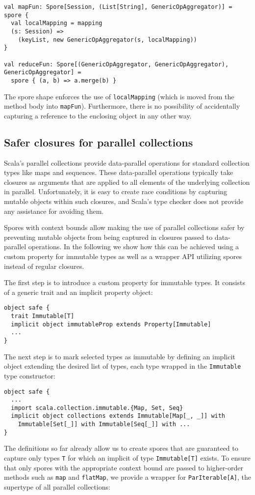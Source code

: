 \documentclass{llncs}
\begin{document}
\begin{lstlisting}
val mapFun: Spore[Session, (List[String], GenericOpAggregator)] = spore {
  val localMapping = mapping
  (s: Session) =>
    (keyList, new GenericOpAggregator(s, localMapping))
}

val reduceFun: Spore[(GenericOpAggregator, GenericOpAggregator), GenericOpAggregator] =
  spore { (a, b) => a.merge(b) }
\end{lstlisting}
\noindent
The spore shape enforces the use of \verb|localMapping| (which is moved from the method body into \verb|mapFun|). Furthermore, there is no possibility of accidentally capturing a reference to the enclosing object in any other way.


\subsection{Safer closures for parallel collections}

Scala's parallel collections provide data-parallel operations for standard collection types like maps and sequences. These data-parallel operations typically take closures as arguments that are applied to all elements of the underlying collection in parallel. Unfortunately, it is easy to create race conditions by capturing mutable objects within such closures, and Scala's type checker does not provide any assistance for avoiding them.

Spores with context bounds allow making the use of parallel collections safer by preventing mutable objects from being captured in closures passed to data-parallel operations. In the following we show how this can be achieved using a custom property for immutable types as well as a wrapper API utilizing spores instead of regular closures.

The first step is to introduce a custom property for immutable types. It consists of a generic trait and an implicit property object:

\begin{verbatim}
object safe {
  trait Immutable[T]
  implicit object immutableProp extends Property[Immutable]
  ...
}
\end{verbatim}
\noindent
The next step is to mark selected types as immutable by defining an implicit object extending the desired list of types, each type wrapped in the \verb|Immutable| type constructor:

\begin{verbatim}
object safe {
  ...
  import scala.collection.immutable.{Map, Set, Seq}
  implicit object collections extends Immutable[Map[_, _]] with
    Immutable[Set[_]] with Immutable[Seq[_]] with ...
}
\end{verbatim}
\noindent
The definitions so far already allow us to create spores that are guaranteed to capture only types \verb|T| for which an implicit of type \verb|Immutable[T]| exists. To ensure that only spores with the appropriate context bound are passed to higher-order methods such as \verb|map| and \verb|flatMap|, we provide a wrapper for \verb|ParIterable[A]|, the supertype of all parallel collections:
\end{document}
